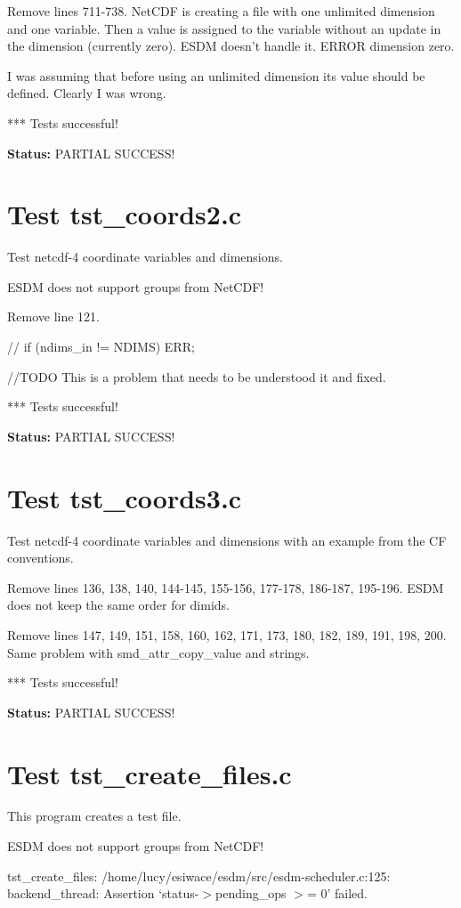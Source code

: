 Remove lines 711-738. NetCDF is creating a file with one unlimited dimension and one variable. Then a value is assigned to the variable without an update in the dimension (currently zero). ESDM doesn't handle it. ERROR dimension zero.

I was assuming that before using an unlimited dimension its value should be defined. Clearly I was wrong.

*** Tests successful!

{\bf \large Status: } PARTIAL SUCCESS!

\section{Test tst\_coords2.c}

Test netcdf-4 coordinate variables and dimensions.

ESDM does not support groups from NetCDF!

Remove line 121.

// if (ndims\_in != NDIMS) ERR;

//TODO This is a problem that needs to be understood it and fixed.

*** Tests successful!

{\bf \large Status: } PARTIAL SUCCESS!

\section{Test tst\_coords3.c}

Test netcdf-4 coordinate variables and dimensions with an example from the CF conventions.

Remove lines 136, 138, 140, 144-145, 155-156, 177-178, 186-187, 195-196. ESDM does not keep the same order for dimids.

Remove lines 147, 149, 151, 158, 160, 162, 171, 173, 180, 182, 189, 191, 198, 200. Same problem with smd\_attr\_copy\_value and strings.

*** Tests successful!

{\bf \large Status: } PARTIAL SUCCESS!

\section{Test tst\_create\_files.c}

This program creates a test file.

ESDM does not support groups from NetCDF!

tst\_create\_files: /home/lucy/esiwace/esdm/src/esdm-scheduler.c:125: backend\_thread: Assertion `status-$>$pending\_ops $>$= 0' failed.

